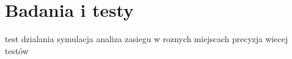 \section*{Badania i testy} 
test dzialania
symulacja
analiza zasiegu w roznych miejscach
precyzja
wiecej testów
